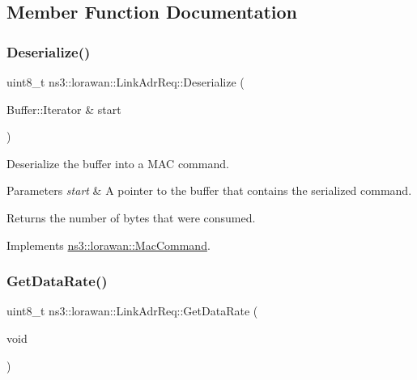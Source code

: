 \subsection{Member Function Documentation}
\mbox{\label{classns3_1_1lorawan_1_1LinkAdrReq_abd1ff0ffcc32ec6a768e12eb18df2cee}} 
\subsubsection{\texorpdfstring{Deserialize()}{Deserialize()}}
{\footnotesize\ttfamily uint8\+\_\+t ns3\+::lorawan\+::\+Link\+Adr\+Req\+::\+Deserialize (\begin{DoxyParamCaption}\item[{Buffer\+::\+Iterator \&}]{start }\end{DoxyParamCaption})\hspace{0.3cm}{\ttfamily [virtual]}}

Deserialize the buffer into a M\+AC command.


\begin{DoxyParams}{Parameters}
{\em start} & A pointer to the buffer that contains the serialized command. \\
\hline
\end{DoxyParams}
\begin{DoxyReturn}{Returns}
the number of bytes that were consumed. 
\end{DoxyReturn}


Implements \hyperlink{classns3_1_1lorawan_1_1MacCommand_af12d223a71a67196bce498f1240eda75}{ns3\+::lorawan\+::\+Mac\+Command}.

\mbox{\label{classns3_1_1lorawan_1_1LinkAdrReq_a21c567d9b65c39406555d42450d78018}} 
\subsubsection{\texorpdfstring{Get\+Data\+Rate()}{GetDataRate()}}
{\footnotesize\ttfamily uint8\+\_\+t ns3\+::lorawan\+::\+Link\+Adr\+Req\+::\+Get\+Data\+Rate (\begin{DoxyParamCaption}\item[{void}]{ }\end{DoxyParamCaption})}

